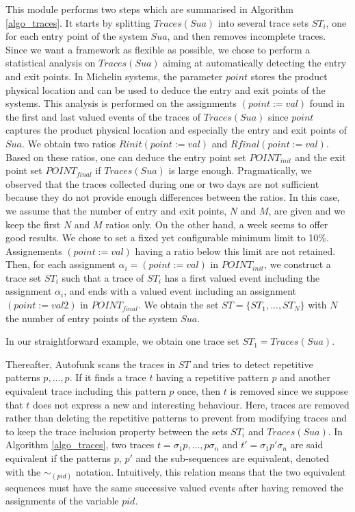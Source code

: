 This module performs two steps which are summarised in Algorithm
\ref{algo_traces}. It starts by splitting $Traces(Sua)$ into
several trace sets $ST_i$, one for each entry point of the system
$Sua$, and then removes incomplete traces. Since we want a
framework as flexible as possible, we chose to perform a
statistical analysis on $Traces(Sua)$ aiming at automatically
detecting the entry and exit points.
In Michelin systems, the parameter $point$ stores the product
physical location and can be used to deduce the entry and exit
points of the systems.
This analysis is performed on the assignments $(point:=val)$
found in the first and last valued events of the traces of
$Traces(Sua)$ since $point$ captures the product physical
location and especially the entry and exit points of $Sua$.
We obtain two ratios $Rinit(point:=val)$ and
$Rfinal(point:=val)$.  Based on these ratios, one can deduce the
entry point set $POINT_{init}$ and the exit point set
$POINT_{final}$ if $Traces(Sua)$ is large enough. Pragmatically,
we observed that the traces collected during one or two days are
not sufficient because they do not provide enough differences
between the ratios. In this case, we assume that the number of
entry and exit points, $N$ and $M$, are given and we keep the
first $N$ and $M$ ratios only. On the other hand, a week seems to
offer good results. We chose to set a fixed yet configurable
minimum limit to 10\%. Assignements $(point:=val)$ having a ratio
below this limit are not retained. Then, for each assignment
$\alpha_i=(point:=val)$ in $POINT_{init}$, we construct a trace
set $ST_i$ such that a trace of $ST_i$ has a first valued event
including the assignment $\alpha_i$, and ends with a valued event
including an assignment $(point:=val2)$ in $POINT_{final}$. We
obtain the set $ST=\{ST_1,...,ST_N\}$ with $N$ the number of
entry points of the system $Sua$.

In our straightforward example, we obtain one trace set
$ST_1=Traces(Sua)$.

Thereafter, Autofunk scans the traces in $ST$ and tries
to detect repetitive patterns $p,...,p$. If it finds a trace $t$
having a repetitive pattern $p$ and another equivalent trace
including this pattern $p$ once, then $t$ is removed since we
suppose that $t$ does not express a new and interesting
behaviour. Here, traces are removed rather than deleting the
repetitive patterns to prevent from modifying traces and to keep
the trace inclusion property between the sets $ST_i$ and
$Traces(Sua)$.
In Algorithm \ref{algo_traces}, two traces $t=\sigma_1 p,...,p
\sigma_n$ and $t'=\sigma_1 p' \sigma_n$ are said equivalent if
the patterns $p$, $p'$ and the sub-sequences are equivalent,
denoted with the $\sim_{(pid)}$ notation. Intuitively, this
relation means that the two equivalent sequences must have the
same successive valued events after having removed the
assignments of the variable $pid$.

